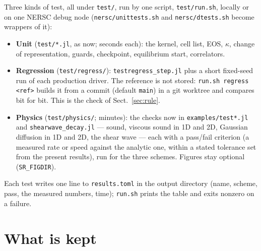 \documentclass[11pt,aps,preprint,nofootinbib,superscriptaddress,tightenlines]{revtex4-2}
\def\Sect#1{Sect.~\ref{#1}}
\newcommand{\file}[1]{\texttt{#1}}
\begin{document}
Three kinds of test, all under \file{test/}, run by one script, \file{test/run.sh}, locally or
on one NERSC debug node (\file{nersc/unittests.sh} and \file{nersc/dtests.sh} become wrappers
of it):
\begin{itemize}
\item \textbf{Unit} (\file{test/*.jl}, as now; seconds each): the kernel, cell list, EOS,
  $\kappa$, change of representation, guards, checkpoint, equilibrium start, correlators.
\item \textbf{Regression} (\file{test/regress/}): \file{testregress\_step.jl} plus a short
  fixed-seed run of each production driver.  The reference is not stored: \file{run.sh
  regress <ref>} builds it from a commit (default \file{main}) in a git worktree and compares
  bit for bit.  This is the check of \Sect{sec:rule}.
\item \textbf{Physics} (\file{test/physics/}; minutes): the checks now in \file{examples/test*.jl}
  and \file{shearwave\_decay.jl} --- sound, viscous sound in 1D and 2D, Gaussian diffusion in 1D
  and 2D, the shear wave --- each with a pass/fail criterion (a measured rate or speed against
  the analytic one, within a stated tolerance set from the present results), run for the
  three schemes.  Figures stay optional (\file{SR\_FIGDIR}).
\end{itemize}
Each test writes one line to \file{results.toml} in the output directory (name, scheme, pass,
the measured numbers, time); \file{run.sh} prints the table and exits nonzero on a failure.

\section{What is kept}
\label{sec:keep}
\end{document}
